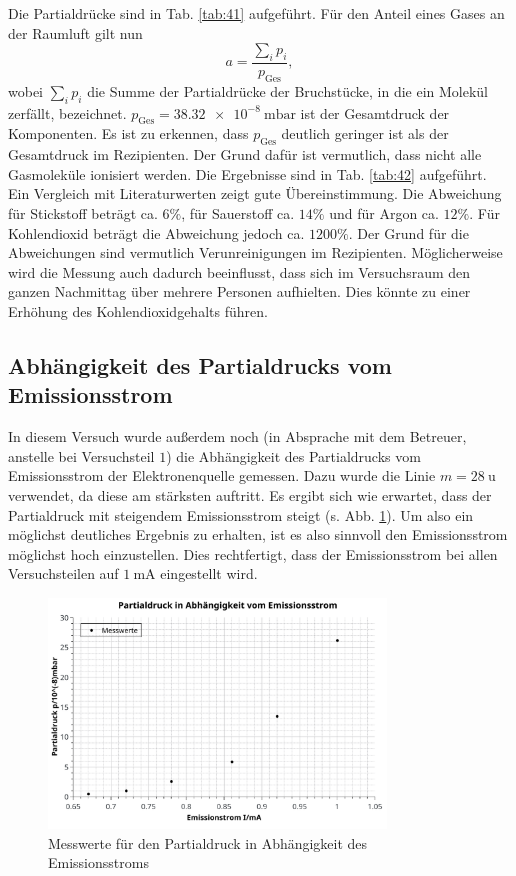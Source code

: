 Die Partialdrücke sind in Tab. \ref{tab:41} aufgeführt. Für den Anteil eines Gases an der Raumluft gilt nun
\begin{equation}
 a = \frac{\sum_{i}p_{i}}{p_{\textrm{Ges}}},
\end{equation}
wobei $\sum_{i}p_{i}$ die Summe der Partialdrücke der Bruchstücke, in die ein Molekül zerfällt, bezeichnet. $p_{\textrm{Ges}}=\SI{38,32e-8}{\milli\bar}$ ist der Gesamtdruck der Komponenten. Es ist zu erkennen, dass $p_{\textrm{Ges}}$ deutlich geringer ist als der Gesamtdruck im Rezipienten.
Der Grund dafür ist vermutlich, dass nicht alle Gasmoleküle ionisiert werden.
Die Ergebnisse sind in Tab. \ref{tab:42} aufgeführt. Ein Vergleich mit Literaturwerten \cite{lubw} zeigt gute Übereinstimmung. Die Abweichung für Stickstoff beträgt ca. $6\%$, für Sauerstoff ca. $14\%$ und für Argon ca. $12\%$. Für Kohlendioxid beträgt die Abweichung jedoch ca. $1200\%$. Der Grund für die Abweichungen sind vermutlich Verunreinigungen im Rezipienten.
Möglicherweise wird die Messung auch dadurch beeinflusst, dass sich im Versuchsraum den ganzen Nachmittag über mehrere Personen aufhielten. Dies könnte zu einer Erhöhung des Kohlendioxidgehalts führen.

\subsection{Abhängigkeit des Partialdrucks vom Emissionsstrom}

In diesem Versuch wurde außerdem noch (in Absprache mit dem Betreuer, anstelle bei Versuchsteil $1$) die Abhängigkeit des Partialdrucks vom Emissionsstrom der Elektronenquelle gemessen. Dazu wurde die Linie $m=\SI{28}{\amu}$ verwendet, da diese am stärksten auftritt.
Es ergibt sich wie erwartet, dass der Partialdruck mit steigendem Emissionsstrom steigt (s. Abb. \ref{fig:v43}). Um also ein möglichst deutliches Ergebnis zu erhalten, ist es also sinnvoll den Emissionsstrom möglichst hoch einzustellen. Dies rechtfertigt, dass der Emissionsstrom bei allen Versuchsteilen auf $\SI{1}{\milli\ampere}$ eingestellt wird.

\begin{figure}[tb]
	\centering\includegraphics[width=0.8\textwidth]{fig/a4_emissionsstrom.pdf}
	\caption{Messwerte für den Partialdruck in Abhängigkeit des Emissionsstroms}
	\label{fig:v43}
\end{figure}

